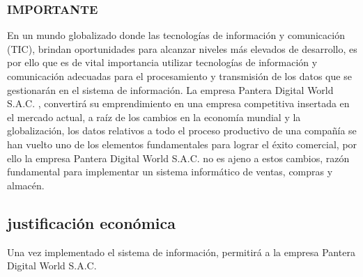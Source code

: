\documentclass[12pt,a4paper]{article}
\newcommand{\newsubsection}[1]{\subsection{\hspace{4mm} #1}}
\newcommand{\empresa}{Pantera Digital World S.A.C. }
\begin{document}
\subsubsection*{IMPORTANTE}
En un mundo globalizado donde las tecnologías de información y comunicación (TIC), brindan oportunidades para alcanzar niveles más elevados de desarrollo, es por ello que es de vital importancia utilizar tecnologías de información y comunicación adecuadas para el procesamiento y transmisión de los datos que se gestionarán en el sistema de información.
La empresa \empresa, convertirá su emprendimiento en una empresa competitiva insertada en el mercado actual, a raíz de los cambios en la economía mundial y la globalización, los datos relativos a todo el proceso productivo de una compañía se han vuelto uno de los elementos fundamentales para lograr el éxito comercial, por ello la empresa \empresa no es ajeno a estos cambios, razón fundamental para implementar un sistema informático de ventas, compras y almacén.


\newsubsection{justificación económica}
Una vez implementado el sistema de información, permitirá a la empresa \empresa %
\end{document}

